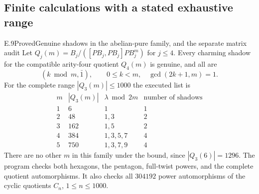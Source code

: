 \subsection{Finite calculations with a stated exhaustive range}

\begin{statement}{E.9}{Proved}{Genuine shadows in the abelian-pure family, and the separate matrix audit}
Let $Q_j(m)=B_j/([PB_j,PB_j]PB_j^m)$ for $j\leq4$.
Every charming shadow for the compatible arity-four quotient $Q_4(m)$
is genuine, and all are
\[
 (k\bmod m,\bar1),\qquad 0\leq k<m,\quad\gcd(2k+1,m)=1.
\]
For the complete range $|Q_3(m)|\leq1000$ the executed list is
\[
\begin{array}{c|r|l|r}
 m&|Q_3(m)|&\lambda\bmod2m&\text{number of shadows}\\\hline
 1&6&1&1\\
 2&48&1,3&2\\
 3&162&1,5&2\\
 4&384&1,3,5,7&4\\
 5&750&1,3,7,9&4
\end{array}
\]
There are no other $m$ in this family under the bound, since
$|Q_3(6)|=1296$.  The program checks both hexagons, the pentagon,
full-twist powers, and the complete quotient automorphisms.
It also checks all $304192$ power automorphisms of the cyclic
quotients $C_n$, $1\leq n\leq1000$.
\end{statement}
